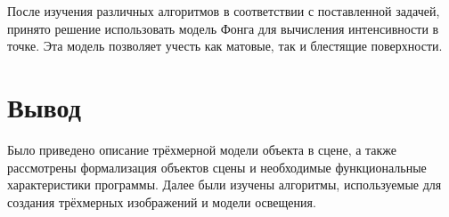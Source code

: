 После изучения различных алгоритмов в соответствии с поставленной задачей, принято решение использовать модель Фонга для вычисления интенсивности в точке. 
Эта модель позволяет учесть как матовые, так и блестящие поверхности.

\section*{Вывод}
Было приведено описание трёхмерной модели объекта в сцене, а также рассмотрены формализация объектов сцены и необходимые функциональные характеристики программы. 
Далее были изучены алгоритмы, используемые для создания трёхмерных изображений и модели освещения.
